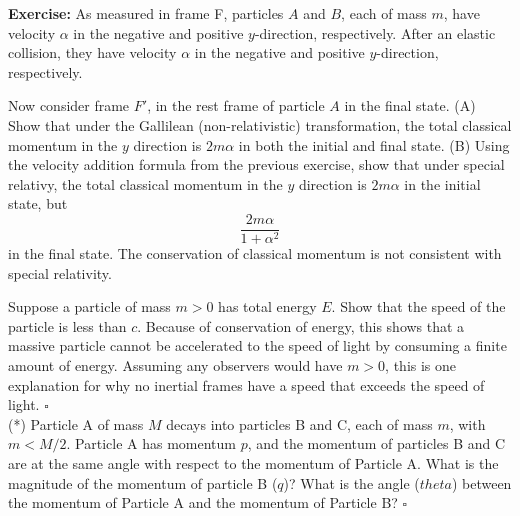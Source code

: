 \documentclass[12pt]{article}
\begin{document}
\noindent
{\bf Exercise:}
As measured in frame F, particles $A$ and $B$, each of mass $m$, have velocity $\alpha$ in the negative and positive 
$y$-direction, respectively.  After an elastic collision, they have velocity $\alpha$ in the negative and positive 
$y$-direction, respectively.
\begin{center}
\end{center}
Now consider frame $F'$, in the rest frame of particle $A$ in the
final state.  (A) Show that under the Gallilean (non-relativistic)
transformation, the total classical momentum in the $y$ direction is
$2m\alpha$ in both the initial and final state. (B) Using the velocity
addition formula from the previous exercise, show that under special relativy,
the total classical momentum in the $y$ direction is 
$2 m \alpha$ in the initial state, but
$$\frac{2 m \alpha}{1 + \alpha^2}$$
in the final state.  The conservation of classical momentum is not
consistent with special relativity.

\exercise Suppose a particle of mass $m>0$ has total energy $E$.  Show
that the speed of the particle is less than $c$.  Because of
conservation of energy, this shows that a massive particle cannot be
accelerated to the speed of light by consuming a finite amount of
energy.  Assuming any observers would have $m>0$, this is one
explanation for why no inertial frames have a speed that exceeds the
speed of light. $\square$ \\[3pt]


\exercise (*)
Particle A of mass $M$ decays into particles B and C, each of mass
$m$, with $m < M/2$.  Particle A has momentum $p$, and the momentum of
particles B and C are at the same angle with respect to the momentum
of Particle A.  What is the magnitude of the momentum of particle B
($q$)?  What is the angle ($theta$) between the momentum of Particle A
and the momentum of Particle B? $\square$ \\[3pt]
\end{document}
